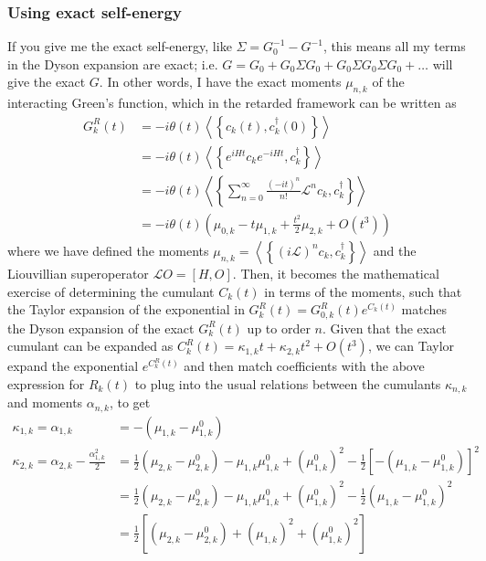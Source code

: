 \subsubsection{Using exact self-energy}
If you give me the exact self-energy, like $\Sigma = G_0^{-1} - G^{-1}$, this means all my terms in the Dyson expansion are exact; i.e. $G = G_0 + G_0 \Sigma G_0 + G_0 \Sigma G_0 \Sigma G_0 + \ldots$ will give the exact $G$. In other words, I have the exact moments $\mu_{n,k}$ of the interacting Green's function, which in the retarded framework can be written as
\begin{align}
G_k^R(t)&=-i \theta(t)\left\langle\left\{c_k(t), c_k^{\dagger}(0)\right\}\right\rangle \\
&=-i \theta(t)\left\langle\left\{e^{i H t} c_k e^{-i H t}, c_k^{\dagger}\right\}\right\rangle \\
&=-i \theta(t)\left\langle\left\{\sum_{n=0}^{\infty} \frac{(-i t)^n}{n!} \mathcal{L}^n c_k, c_k^{\dagger}\right\}\right\rangle \\
&=-i \theta(t)\left( \mu_{0,k}- t\mu_{1,k}+\frac{t^2}{2}\mu_{2,k}+O(t^3) \right)
\end{align}
where we have defined the moments $\mu_{n,k}=\left\langle\left\{\left(i \mathcal{L} \right)^n c_k, c_k^{\dagger}\right\}\right\rangle$ and the Liouvillian superoperator $\mathcal{L} O=[H,O]$. Then, it becomes the mathematical exercise of determining the cumulant $C_k(t)$ in terms of the moments, such that the Taylor expansion of the exponential in $G_k^R(t) = G_{0,k}^R(t) e^{C_k(t)}$ matches the Dyson expansion of the exact $G_k^R(t)$ up to order $n$. Given that the exact cumulant can be expanded as $C_k^R(t) = \kappa_{1,k} t + \kappa_{2,k} t^2 + O(t^3)$, we can Taylor expand the exponential $e^{C_k^R(t)}$ and then match coefficients with the above expression for $R_k(t)$ to plug into the usual relations between the cumulants $\kappa _{n,k}$ and moments $\alpha_{n,k}$, to get
\begin{align}
    \kappa_{1,k} = \alpha_{1,k} &= -\left(\mu_{1,k}-\mu_{1,k}^0\right)\\
    \kappa_{2,k} = \alpha_{2,k} - \frac{\alpha_{1,k}^2}{2} &= \frac{1}{2}\left(\mu_{2,k}-\mu_{2,k}^0\right)-\mu_{1,k}\mu_{1,k}^0+\left(\mu_{1,k}^0\right)^2 -\frac{1}{2}{\left[-\left(\mu_{1,k}-\mu_{1,k}^0\right)\right]^2}\\
&= \frac{1}{2}\left(\mu_{2,k}-\mu_{2,k}^0\right)-\mu_{1,k}\mu_{1,k}^0+\left(\mu_{1,k}^0\right)^2 -\frac{1}{2}\left(\mu_{1,k}-\mu_{1,k}^0\right)^2\\
&= \frac{1}{2}\left[\left( \mu_{2,k} - \mu_{2,k}^0 \right) +\left( \mu_{1,k} \right)^2 + \left( \mu_{1,k}^0 \right)^2 \right]
\end{align}
